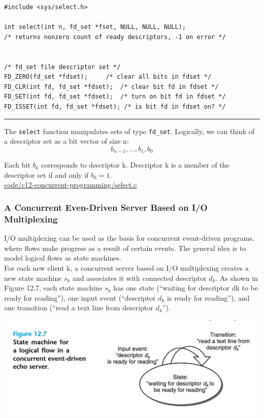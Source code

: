 \documentclass[11pt]{article}
\begin{document}
\begin{verbatim}
#include <sys/select.h>

int select(int n, fd_set *fset, NULL, NULL, NULL);
/* returns nonzero count of ready descriptors, -1 on error */


/* fd_set file descriptor set */
FD_ZERO(fd_set *fdset);		/* clear all bits in fdset */
FD_CLR(int fd, fd_set *fdset);	/* clear bit fd in fdset */
FD_SET(int fd, fd_set *fdset);	/* turn on bit fd in fdset */
FD_ISSET(int fd, fd_set *fdset); /* is bit fd in fdset on? */

\end{verbatim}

\noindent\rule{\textwidth}{0.5pt}

The \texttt{select} function manipulates sets of type \texttt{fd\_set}. Logically, we can think of a descriptor set as a bit vector of size n:\\
\begin{equation}
b_{n-1}, ... , b_1, b_0
\end{equation}

Each bit \(b_k\) corresponds to descriptor k. Descriptor k is a member of the descriptor set if and only if \(b_k = 1\).\\


\url{code/c12-concurrent-programming/select.c}\\


\subsubsection{A Concurrent Even-Driven Server Based on I/O Multiplexing}
\label{sec:orgdaa93dc}

I/O multiplexing can be used as the basis for concurrent event-driven programs, where flows make progress as a result of certain events. The general idea is to model logical flows as state machines.\\

For each new client k, a concurrent server based on I/O multiplexing creates a new state machine \(s_k\) and associates it with connected descriptor \(d_k\). As shown in Figure 12.7, each state machine \(s_k\) has one state (“waiting for descriptor dk to be ready for reading”), one input event (“descriptor \(d_k\) is ready for reading”), and one transition (“read a text line from descriptor \(d_k\)”).\\

\begin{center}
\includegraphics[width=.9\linewidth]{pics/figure12.7-state-machine-for-a-logical-flow-in-a-concurrent-event-driven-echo-server.png}
\end{center}
\end{document}
